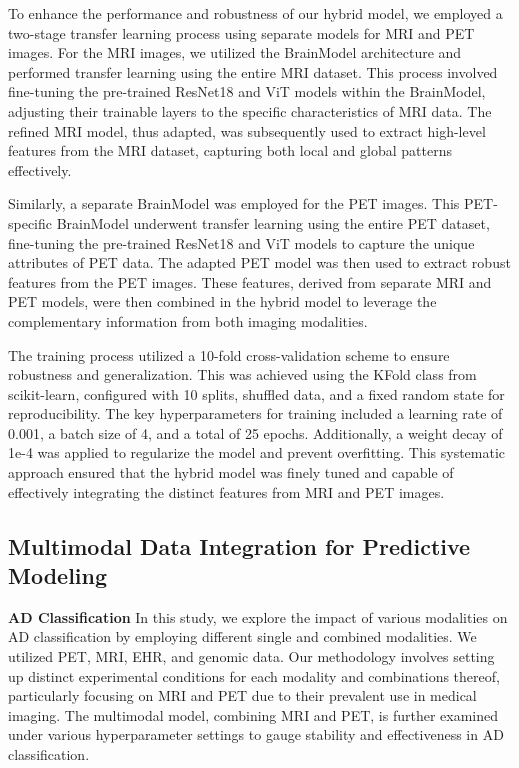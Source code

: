 To enhance the performance and robustness of our hybrid model, we employed a two-stage transfer learning process using separate models for MRI and PET images. For the MRI images, we utilized the BrainModel architecture and performed transfer learning using the entire MRI dataset. This process involved fine-tuning the pre-trained ResNet18 and ViT models within the BrainModel, adjusting their trainable layers to the specific characteristics of MRI data. The refined MRI model, thus adapted, was subsequently used to extract high-level features from the MRI dataset, capturing both local and global patterns effectively.

Similarly, a separate BrainModel was employed for the PET images. This PET-specific BrainModel underwent transfer learning using the entire PET dataset, fine-tuning the pre-trained ResNet18 and ViT models to capture the unique attributes of PET data. The adapted PET model was then used to extract robust features from the PET images. These features, derived from separate MRI and PET models, were then combined in the hybrid model to leverage the complementary information from both imaging modalities.

The training process utilized a 10-fold cross-validation scheme to ensure robustness and generalization. This was achieved using the KFold class from scikit-learn, configured with 10 splits, shuffled data, and a fixed random state for reproducibility. The key hyperparameters for training included a learning rate of 0.001, a batch size of 4, and a total of 25 epochs. Additionally, a weight decay of 1e-4 was applied to regularize the model and prevent overfitting. This systematic approach ensured that the hybrid model was finely tuned and capable of effectively integrating the distinct features from MRI and PET images.

\subsection{Multimodal Data Integration for Predictive Modeling}
\textbf{AD Classification}
In this study, we explore the impact of various modalities on AD classification by employing different single and combined modalities. We utilized PET, MRI, EHR, and genomic data. Our methodology involves setting up distinct experimental conditions for each modality and combinations thereof, particularly focusing on MRI and PET due to their prevalent use in medical imaging. The multimodal model, combining MRI and PET, is further examined under various hyperparameter settings to gauge stability and effectiveness in AD classification. 

